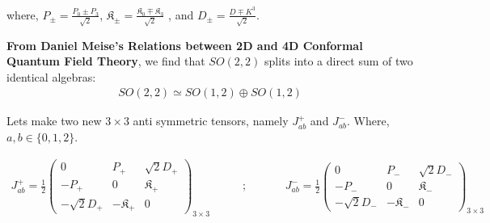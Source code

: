 \documentclass[]{article}
\numberwithin{equation}{section}
\begin{document}
{{\begin{table}[h!]
\centering
\caption{\label{tabelinterpolationlfd}$1+1$ conformal algebra in LFD}
\end{table}
where, $P_{\pm}=\frac{P_{0}\pm{P_{3}}}{\sqrt{2}}$, $\mathfrak{K}_{\pm}=\frac{\mathfrak{K}_{0}\mp\mathfrak{K}_{3}}{\sqrt{2}}$ , and $D_{\pm}=\frac{D\mp{K^{3}}}{\sqrt{2}}$.


\textbf{From Daniel Meise's Relations between 2D and 4D Conformal Quantum Field Theory}, we find that $SO(2,2)$ splits into a direct sum of two identical algebras:
\begin{align}
    SO(2,2)\simeq SO(1,2)\oplus SO(1,2)
\end{align}

Lets make two new $3\times3$ anti symmetric tensors, namely $J_{ab}^{+}$ and $J_{ab}^{-}$. Where, $a,b\in\{0,1,2\}$.

\begin{align}
    J_{ab}^{+}=\frac{1}{2}\begin{pmatrix}
            0&{P_{+}}&{\sqrt{2}D_{+}}\\
            {-P_{+}}&0&{\mathfrak{K}_{+}}\\
            {-\sqrt{2}D_{+}}&{-\mathfrak{K}_{+}}&0
               \end{pmatrix}_{3\times3}~~~~~~~~~~~~~;~~~~~~~~~~~~~~~J_{ab}^{-}=\frac{1}{2}\begin{pmatrix}
            0&{P_{-}}&{\sqrt{2}D_{-}}\\
            {-P_{-}}&0&{\mathfrak{K}_{-}}\\
            {-\sqrt{2}D_{-}}&{-\mathfrak{K}_{-}}&0
               \end{pmatrix}_{3\times3}
\end{align}


}}
\end{document}
